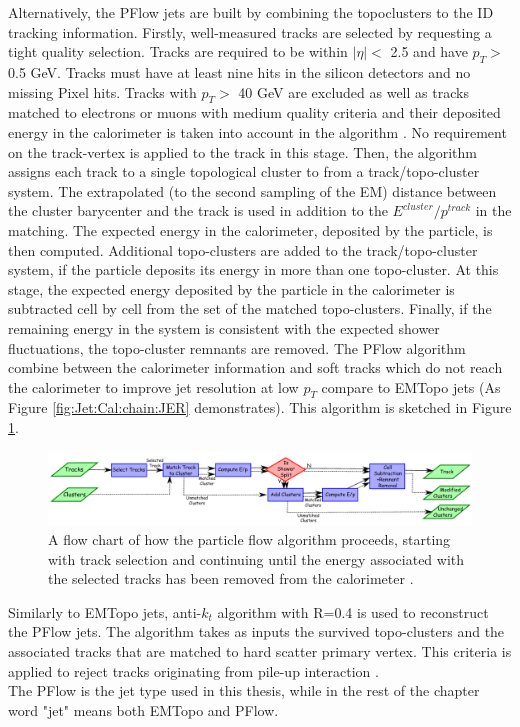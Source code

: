 Alternatively, the PFlow jets are built by combining the topoclusters to the ID tracking information. Firstly, well-measured tracks are selected by requesting a tight quality selection. Tracks are required to be within $|\eta|<$ 2.5 and have $p_T>$ 0.5 GeV. Tracks must have at least nine hits in the silicon detectors and no missing Pixel hits. Tracks with $p_T>$ 40 GeV are excluded as well as tracks matched to electrons or muons with medium quality criteria and their deposited energy in the calorimeter is taken into account in the algorithm \cite{PFlow_Reco}. No requirement on the track-vertex is applied to the track in this stage. Then, the algorithm assigns each track to a single topological cluster to from a track/topo-cluster system. The extrapolated (to the second sampling of the EM) distance between the cluster barycenter and the track is used in addition to the $E^{cluster}/p^{track}$ in the matching. The expected energy in the calorimeter, deposited by the particle, is then computed. Additional topo-clusters are added to the track/topo-cluster system, if the particle deposits its energy in more than one topo-cluster. At this stage, the expected energy deposited by the particle in the calorimeter is subtracted cell by cell from the set of the matched topo-clusters. Finally, if the remaining energy in the system is consistent with the expected shower fluctuations, the topo-cluster remnants are removed. The PFlow algorithm combine between the calorimeter information and soft tracks which do not reach the calorimeter to improve jet resolution at low $p_T$ compare to EMTopo jets (As Figure \ref{fig:Jet:Cal:chain:JER} demonstrates). This algorithm is sketched in Figure \ref{fig:Jet:JR:PFlowSketch}. 

\begin{figure}[H]
    \centering
    \includegraphics[width=1.\textwidth]{Ch4/Img/PFlow_Algo.png}
    \caption{A flow chart of how the particle flow algorithm proceeds, starting with track selection and continuing until the energy associated with the selected tracks has been removed from the calorimeter \cite{PFlow_Reco}.}
    \label{fig:Jet:JR:PFlowSketch}
\end{figure}
Similarly to EMTopo jets, anti-$k_t$ algorithm with R=0.4 is used to reconstruct the PFlow jets. The algorithm takes as inputs the survived topo-clusters and the associated tracks that are matched to hard scatter primary vertex. This criteria is applied to reject tracks originating from pile-up interaction \cite{Jet_pileUp}. \\
The PFlow is the jet type used in this thesis, while in the rest of the chapter word "jet" means both EMTopo and PFlow.


